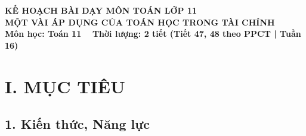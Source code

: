 \documentclass[12pt, a4paper]{article}
\begin{document}
\begin{center}
    {\fontsize{14pt}{17pt}\selectfont \textbf{KẾ HOẠCH BÀI DẠY MÔN TOÁN LỚP 11}}\\[6pt]
    {\fontsize{16pt}{19pt}\selectfont \textbf{MỘT VÀI ÁP DỤNG CỦA TOÁN HỌC TRONG TÀI CHÍNH}}\\[4pt]
    {\fontsize{12pt}{15pt}\selectfont \textbf{Môn học: Toán 11} \ \textbar \ \textbf{Thời lượng: 2 tiết (Tiết 47, 48 theo PPCT | Tuần 16)}}
\end{center}

\vspace{5pt}

\section*{I. MỤC TIÊU}

\subsection*{1. Kiến thức, Năng lực}
\end{document}
